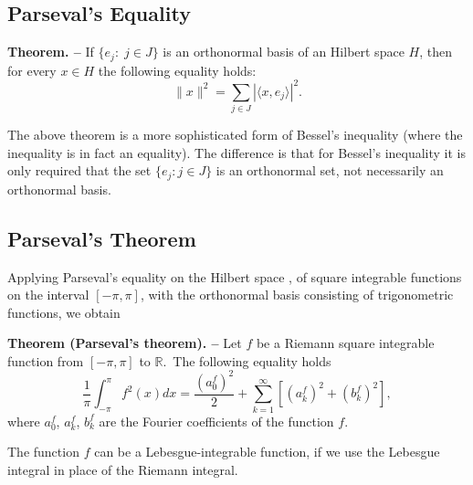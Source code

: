 \documentclass[12pt]{article}
\begin{document}
\subsection{Parseval's Equality}

{\bf Theorem. --} If $\{e_j\!:\; j \in J \}$ is an orthonormal basis of an Hilbert space $H$, then for every $x \in H$ the following equality holds:
\begin{displaymath}
\|x\|^2 = \sum_{j \in J} | \langle x , e_j \rangle |^2 .
\end{displaymath}

The above theorem is a more sophisticated form of Bessel's inequality (where the inequality is in fact an equality). The difference is that for Bessel's inequality it is only required that the set $\{e_j : j \in J \}$ is an orthonormal set, not necessarily an orthonormal basis.

\subsection{Parseval's Theorem}

Applying Parseval's equality on the Hilbert space , of square integrable functions on the interval $[-\pi,\pi]$, with the orthonormal basis consisting of trigonometric functions, we obtain

{\bf Theorem (Parseval's theorem). --} Let $f$ be a Riemann square integrable function from $[-\pi,\pi]$ to $\mathbb{R}$.\, The following equality holds
$$\frac{1}{\pi}\int_{-\pi}^{\pi}f^2(x)dx = \frac{(a_0^f)^2}{2} + \sum_{k=1}^{\infty}[(a_k^f)^2+(b_k^f)^2],$$
where $a_0^f$, $a_k^f$, $b_k^f$ are the Fourier coefficients of the function $f$.

The function $f$ can be a Lebesgue-integrable function, if we use the Lebesgue integral in place of the Riemann integral.
\end{document}
